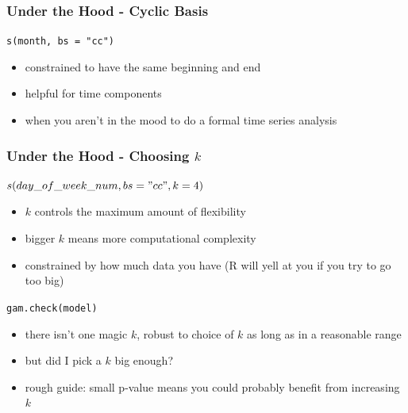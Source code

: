 \documentclass{beamer}
\begin{document}
\begin{frame}
\frametitle{Under the Hood - Cyclic Basis}

\texttt{s(month, bs = "cc")}

\begin{itemize}
\item constrained to have the same beginning and end
\item helpful for time components
\item when you aren't in the mood to do a formal time series analysis
\end{itemize}

\end{frame}

\begin{frame}
\frametitle{Under the Hood - Choosing $k$}

\begin{multicols}{2}
\texttt{$s(day\_of\_week\_num, bs = "cc", k = 4)$}

\begin{itemize}
\item $k$ controls the maximum amount of flexibility
\item bigger $k$ means more computational complexity
\item constrained by how much data you have (R will yell at you if you try to go too big)
\end{itemize}

\columnbreak

\texttt{gam.check(model)}

\begin{itemize}
\item there isn't one magic $k$, robust to choice of $k$ as long as in a reasonable range
\item but did I pick a $k$ big enough?
\item rough guide: small p-value means you could probably benefit from increasing $k$
\end{itemize}

\end{multicols}

\end{frame}
\end{document}
